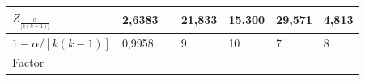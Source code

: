 \documentclass[]{book}
\theoremstyle{definition}
\theoremstyle{definition}
\theoremstyle{definition}
\theoremstyle{remark}
\begin{document}
\begin{longtable}[]{@{}lllllll@{}}
\toprule
\begin{minipage}[b]{0.44\columnwidth}\raggedright
\(Z_{\frac{\alpha}{\lbrack k\left( k - 1 \right)\rbrack}}\)\strut
\end{minipage} & \begin{minipage}[b]{0.06\columnwidth}\raggedright
2,6383\strut
\end{minipage} & \begin{minipage}[b]{0.06\columnwidth}\raggedright
\strut
\end{minipage} & \begin{minipage}[b]{0.07\columnwidth}\raggedright
21,833\strut
\end{minipage} & \begin{minipage}[b]{0.07\columnwidth}\raggedright
15,300\strut
\end{minipage} & \begin{minipage}[b]{0.07\columnwidth}\raggedright
29,571\strut
\end{minipage} & \begin{minipage}[b]{0.06\columnwidth}\raggedright
4,813\strut
\end{minipage}\tabularnewline
\midrule
\endhead
\begin{minipage}[t]{0.44\columnwidth}\raggedright
\(1-\alpha/[k(k-1)]\)\strut
\end{minipage} & \begin{minipage}[t]{0.06\columnwidth}\raggedright
0,9958\strut
\end{minipage} & \begin{minipage}[t]{0.06\columnwidth}\raggedright
\strut
\end{minipage} & \begin{minipage}[t]{0.07\columnwidth}\raggedright
9\strut
\end{minipage} & \begin{minipage}[t]{0.07\columnwidth}\raggedright
10\strut
\end{minipage} & \begin{minipage}[t]{0.07\columnwidth}\raggedright
7\strut
\end{minipage} & \begin{minipage}[t]{0.06\columnwidth}\raggedright
8\strut
\end{minipage}\tabularnewline
\begin{minipage}[t]{0.44\columnwidth}\raggedright
Factor\strut
\end{minipage} & \begin{minipage}[t]{0.06\columnwidth}\raggedright

\end{minipage}
\end{longtable}
\end{document}
